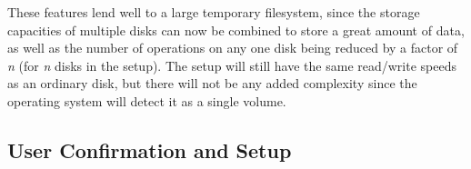 These features lend well to a large temporary filesystem, since the storage capacities of multiple disks can now be combined to store a great amount of data, as well as the number of operations on any one disk being reduced by a factor of \textit{n} (for \textit{n} disks in the setup). The setup will still have the same read/write speeds as an ordinary disk, but there will not be any added complexity since the operating system will detect it as a single volume.

\subsection{User Confirmation and Setup}


%
%

